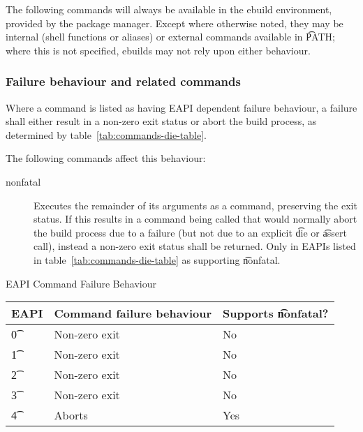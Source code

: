 \label{sec:pkg-mgr-commands}

The following commands will always be available in the ebuild environment, provided by the package
manager. Except where otherwise noted, they may be internal (shell functions or aliases) or external
commands available in \t{PATH}; where this is not specified, ebuilds may not rely upon either
behaviour.

\subsubsection{Failure behaviour and related commands}
\label{sec:failure-behaviour}

 Where a command is listed as having EAPI dependent failure behaviour,
a failure shall either result in a non-zero exit status or abort the build process, as determined by
table~\ref{tab:commands-die-table}.

The following commands affect this behaviour:
\begin{description}
\item[nonfatal]  Executes the remainder of its arguments as a command,
    preserving the exit status. If this results in a command being called that would normally abort
    the build process due to a failure (but not due to an explicit \t{die} or \t{assert} call),
    instead a non-zero exit status shall be returned. Only in EAPIs listed in
    table~\ref{tab:commands-die-table} as supporting \t{nonfatal}.
\end{description}

\begin{centertable}{EAPI Command Failure Behaviour} \label{tab:commands-die-table}
    \begin{tabular}{ l l l }
        \toprule
            \multicolumn{1}{c}{\textbf{EAPI}} &
            \multicolumn{1}{c}{\textbf{Command failure behaviour}} &
            \multicolumn{1}{c}{\textbf{Supports \t{nonfatal}?}} \\
            \midrule
    \t{0} & Non-zero exit & No \\
    \t{1} & Non-zero exit & No \\
    \t{2} & Non-zero exit & No \\
    \t{3} & Non-zero exit & No \\
    \t{4} & Aborts & Yes \\
    \bottomrule
    \end{tabular}
\end{centertable}

